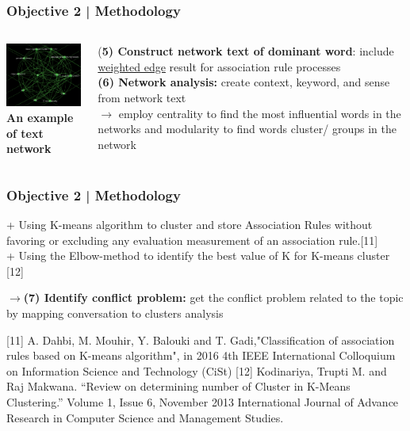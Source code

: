 \documentclass{beamer}
\begin{document}
\begin{frame}
\frametitle{Objective 2 | Methodology}
\begin{columns}
	\begin{column}{.35\textwidth}
		\includegraphics[width=40mm]{nw.png}\\
{\scriptsize 	\textbf{An example of text network}}
	\end{column}

	\begin{column}{.60\textwidth}
(\textbf{5) Construct network text of dominant word}: include\underline{ weighted edge} result for association rule processes\\
\textbf{(6) Network analysis:} create context, keyword, and sense from network text\\
$\rightarrow$ employ centrality to find the most influential words in the networks and modularity to find words cluster/ groups in the network \\

	\end{column}
\end{columns}
\end{frame}
\begin{frame}
\frametitle{Objective 2 | Methodology}
+ Using K-means algorithm to cluster and  store Association Rules without favoring or excluding any evaluation measurement of an association rule.[11]\\
+ Using the Elbow-method to identify the best value of K for K-means cluster [12]

$\rightarrow$\textbf{(7) Identify conflict problem:} get the conflict problem related to the topic by mapping conversation to clusters analysis\\

\begin{thebibliography}{01}
{\tiny 	{} [11] A. {Dahbi}, M. {Mouhir}, Y. {Balouki} and T. {Gadi},"Classification of association rules based on K-means algorithm", in 2016 4th IEEE International Colloquium on Information Science and Technology (CiSt)}
{\tiny 	{} [12] Kodinariya, Trupti M. and Raj Makwana. “Review on determining number of Cluster in K-Means Clustering.” Volume 1, Issue 6, November 2013 International Journal of Advance Research in 	Computer Science and Management Studies.}
\end{thebibliography}

\end{frame}
\end{document}
